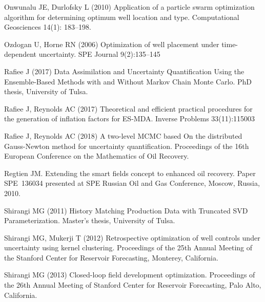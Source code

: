 \documentclass[11pt]{article}
\begin{document}
\begin{thebibliography}{51}


Onwunalu JE, Durlofsky L (2010) Application of a particle swarm optimization algorithm for determining optimum well location and type.
Computational Geosciences 14(1): 183--198.


Ozdogan U, Horne RN (2006) Optimization of well placement under time-dependent
  uncertainty. SPE Journal 9(2):135--145

Rafiee J (2017) Data Assimilation and Uncertainty Quantification Using the Ensemble-Based Methods with and Without Markov Chain Monte Carlo.
PhD thesis, University of Tulsa.

Rafiee J, Reynolds AC (2017)
Theoretical and efficient practical procedures for the generation of inflation factors for ES-MDA.
Inverse Problems 33(11):115003

Rafiee J, Reynolds AC (2018)
A two-level {MCMC} based On the distributed {G}auss-{N}ewton method for uncertainty quantification.
Proceedings of the 16th European Conference on the Mathematics of Oil Recovery. 

Regtien JM.
\newblock Extending the smart fields concept to enhanced oil recovery.
\newblock Paper {SPE}~136034 presented at SPE Russian Oil and Gas Conference,
Moscow, Russia, 2010.


Shirangi MG (2011) History Matching Production Data with Truncated {SVD} Parameterization.
Master's thesis, University of Tulsa.

Shirangi MG, Mukerji T (2012) Retrospective optimization of well controls under uncertainty using kernel clustering.
Proceedings of the 25th Annual Meeting of the Stanford Center for Reservoir Forecasting, Monterey, California.

Shirangi MG (2013) Closed-loop field development optimization.
Proceedings of the 26th Annual Meeting of Stanford Center for Reservoir Forecasting, Palo Alto, California.


\end{thebibliography}
\end{document}
